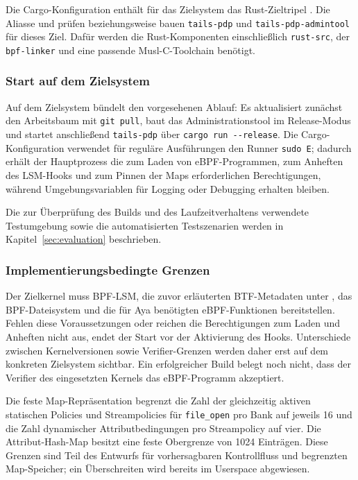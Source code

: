 Die Cargo-Konfiguration enthält für das Zielsystem das Rust-Zieltripel . Die Aliasse \mbox{} und  prüfen beziehungsweise bauen \texttt{tails-pdp} und \texttt{tails-pdp-admintool} für dieses Ziel. Dafür werden die Rust-Komponenten einschließlich \texttt{rust-src}, der \texttt{bpf-linker} und eine passende Musl-C-Toolchain benötigt.

\subsubsection{Start auf dem Zielsystem}
Auf dem Zielsystem bündelt  den vorgesehenen Ablauf: Es aktualisiert zunächst den Arbeitsbaum mit \texttt{git pull}, baut das Administrationstool im Release-Modus und startet anschließend \texttt{tails-pdp} über \texttt{cargo run -{}-release}. Die Cargo-Konfiguration verwendet für reguläre Ausführungen den Runner \texttt{sudo~\-E}; dadurch erhält der Hauptprozess die zum Laden von eBPF-Programmen, zum Anheften des LSM-Hooks und zum Pinnen der Maps erforderlichen Berechtigungen, während Umgebungsvariablen für Logging oder Debugging erhalten bleiben.

Die zur Überprüfung des Builds und des Laufzeitverhaltens verwendete Testumgebung sowie die automatisierten Testszenarien werden in Kapitel~\ref{sec:evaluation} beschrieben.

\subsubsection{Implementierungsbedingte Grenzen}
Der Zielkernel muss BPF-LSM, die zuvor erläuterten BTF-Metadaten unter \mbox{}, das BPF-Dateisystem und die für Aya benötigten eBPF-Funktionen bereitstellen. Fehlen diese Voraussetzungen oder reichen die Berechtigungen zum Laden und Anheften nicht aus, endet der Start vor der Aktivierung des Hooks. Unterschiede zwischen Kernelversionen sowie Verifier-Grenzen werden daher erst auf dem konkreten Zielsystem sichtbar. Ein erfolgreicher Build belegt noch nicht, dass der Verifier des eingesetzten Kernels das eBPF-Programm akzeptiert.

Die feste Map-Repräsentation begrenzt die Zahl der gleichzeitig aktiven statischen Policies und Streampolicies für \texttt{file\_open} pro Bank auf jeweils 16 und die Zahl dynamischer Attributbedingungen pro Streampolicy auf vier. Die Attribut-Hash-Map besitzt eine feste Obergrenze von 1024 Einträgen. Diese Grenzen sind Teil des Entwurfs für vorhersagbaren Kontrollfluss und begrenzten Map-Speicher; ein Überschreiten wird bereits im Userspace abgewiesen.

